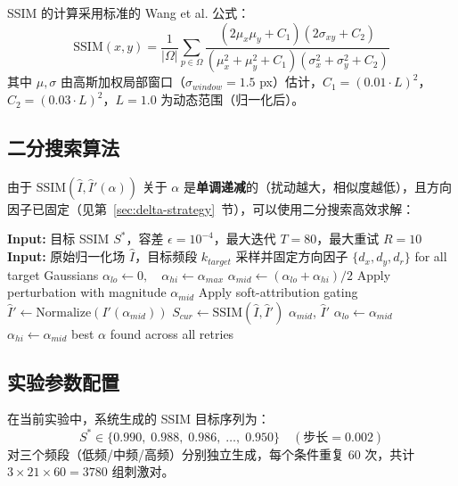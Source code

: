 \documentclass{article}
\begin{document}
SSIM 的计算采用标准的 Wang et al. 公式：
\begin{equation}
\text{SSIM}(x, y) = \frac{1}{|\Omega|} \sum_{p \in \Omega} \frac{(2\mu_x \mu_y + C_1)(2\sigma_{xy} + C_2)}{(\mu_x^2 + \mu_y^2 + C_1)(\sigma_x^2 + \sigma_y^2 + C_2)}
\end{equation}
其中 $\mu, \sigma$ 由高斯加权局部窗口（$\sigma_{window} = 1.5$ px）估计，$C_1 = (0.01 \cdot L)^2$，$C_2 = (0.03 \cdot L)^2$，$L = 1.0$ 为动态范围（归一化后）。

\subsection{二分搜索算法}
由于 $\text{SSIM}(\hat{I}, \hat{I}'(\alpha))$ 关于 $\alpha$ 是\textbf{单调递减}的（扰动越大，相似度越低），且方向因子已固定（见第~\ref{sec:delta-strategy}~节），可以使用二分搜索高效求解：

\begin{algorithm}[H]
\caption{基于 SSIM 的扰动幅度二分搜索}
\begin{algorithmic}[1]
\State \textbf{Input:} 目标 SSIM $S^*$，容差 $\epsilon = 10^{-4}$，最大迭代 $T = 80$，最大重试 $R = 10$
\State \textbf{Input:} 原始归一化场 $\hat{I}$，目标频段 $k_{target}$
 
    \State 采样并固定方向因子 $\{d_x, d_y, d_r\}$ for all target Gaussians
    \State $\alpha_{lo} \leftarrow 0, \quad \alpha_{hi} \leftarrow \alpha_{max}$ 
        \State $\alpha_{mid} \leftarrow (\alpha_{lo} + \alpha_{hi}) / 2$
        \State Apply perturbation with magnitude $\alpha_{mid}$ 
        \State Apply soft-attribution gating 
        \State $\hat{I}' \leftarrow \text{Normalize}(I'(\alpha_{mid}))$ 
        \State $S_{cur} \leftarrow \text{SSIM}(\hat{I}, \hat{I}')$
            \State \Return $\alpha_{mid}$, $\hat{I}'$ 
        \EndIf
         
            \State $\alpha_{lo} \leftarrow \alpha_{mid}$
        \Else {}
            \State $\alpha_{hi} \leftarrow \alpha_{mid}$
        \EndIf
    \EndFor
\EndFor
\State \Return best $\alpha$ found across all retries
\end{algorithmic}
\end{algorithm}

\subsection{实验参数配置}
在当前实验中，系统生成的 SSIM 目标序列为：
\begin{equation}
S^* \in \{0.990,\; 0.988,\; 0.986,\; \dots,\; 0.950\} \quad (\text{步长} = 0.002)
\end{equation}
对三个频段（低频/中频/高频）分别独立生成，每个条件重复 60 次，共计 $3 \times 21 \times 60 = 3780$ 组刺激对。
\end{document}
